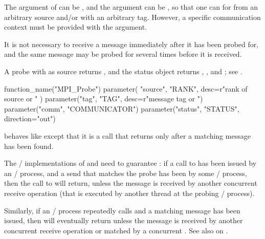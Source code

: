 The  argument of  can be
, and the  argument can be
, so that one can  for  from an arbitrary
source and/or with
an arbitrary tag.  However, a specific communication context
must be provided with the  argument.

It is not necessary to receive a message immediately after it has been
probed for, and the
same message may be probed for several times before it is received.

A probe with  as source returns , and the status object returns \mpicode{ = },
\mpicode{ = }, and ;
see .

\begin{mpi-binding}
    function_name("MPI_Probe")
    parameter(
        "source", "RANK", desc=r"rank of source or "
    )
    parameter("tag", "TAG", desc=r"message tag or ")
    parameter("comm", "COMMUNICATOR")
    parameter("status", "STATUS", direction="out")
\end{mpi-binding}

 behaves like  except that it is a 
call that returns only after a matching message has been found.

The \MPI/ implementations of  and  need
to guarantee :
if a call to  has been issued by an \MPI/ process, and a send that
matches the probe has been  by some \MPI/ process, then the call to
 will return, unless the message is received by another
concurrent receive operation (that is executed by another thread at the probing
\MPI/ process).

Similarly, if an \MPI/ process repeatedly calls
 and a matching message has been issued,
then
 will eventually return 
unless the message is received by another concurrent receive
operation or matched by a concurrent .
See also  on .

